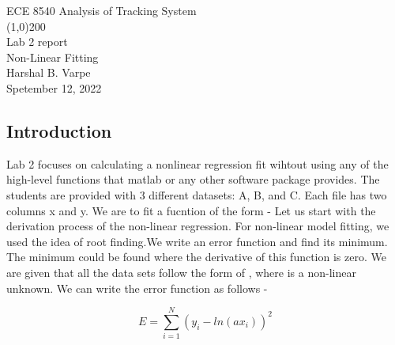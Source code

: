 \documentclass{article}
\begin{document}
\begin{titlepage}
	\begin{center}
	\LARGE{ECE 8540 Analysis of Tracking System}\\
	\line(1,0){200}\\
	[5mm]
	\Large{Lab 2 report}\\
	\Large{Non-Linear Fitting}\\
	[150mm]
	\large{Harshal B. Varpe}\\
	Spetember 12, 2022
	\end{center}
\end{titlepage}
\begin{center}
\section{Introduction}\label{sec:intro}
\end{center}

Lab 2 focuses on calculating a nonlinear regression fit wihtout using any of the high-level functions that matlab or any other software package provides. The students are provided with 3 different datasets: A, B, and C. Each file has two columns x and y. We are to fit a fucntion of the form - 
Let us start with the derivation process of the non-linear regression.
For non-linear model fitting, we used the idea of root finding.We write an error function and find its minimum. The minimum could be found where the derivative of this function is zero. We are given that all the data sets follow the form of , where  is a non-linear unknown.
We can write the error function as follows -

\begin{equation}\label{eq1}
E = \sum_{i=1}^{N} (y_i-ln(ax_i)) ^2
\end{equation}
\end{document}

